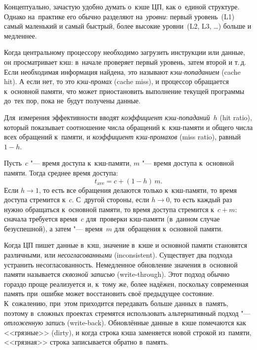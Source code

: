 Концептуально, зачастую удобно думать о~кэше ЦП, как о~единой структуре. Однако на~практике его обычно разделяют на~\emph{уровни}: первый уровень~(L1) самый маленький и самый быстрый, более высокие уровни~(L2, L3, \ldots) больше и медленнее.

Когда центральному процессору необходимо загрузить инструкции или данные, он просматривает кэш: в~начале проверяет первый уровень, затем второй и т.\,д. Если необходимая информация найдена, это называют \textit{кэш-попаданием} (\textenglish{cache hit}). А если нет, то это \textit{кэш-промах} (\textenglish{cache miss}), и процессор обращается к~основной памяти, что может приостановить выполнение текущей программы до~тех пор, пока не~будут получены данные.

Для~измерения эффективности вводят \emph{коэффициент кэш-попаданий}~\(h\) (\textenglish{hit ratio}), который показывает соотношение числа обращений к~кэш-памяти и общего числа всех обращений к~памяти, и \emph{коэффициент кэш-промахов} (\textenglish{miss ratio}), равный \(1 - h\).

Пусть~\(c\) "--- время доступа к~кэш-памяти, \(m\) "--- время доступа к~основной памяти. Тогда среднее время доступа:
\[
  t_\text{ave} = c + (1 - h)\,m.
\]
Если \(h \rightarrow 1\), то есть все обращения делаются только к~кэш-памяти, то время доступа стремится к~\(c\). С~другой стороны, если \(h \rightarrow 0\), то есть каждый раз нужно обращаться к~основной памяти, то время доступа стремится к~\(c + m\): сначала требуется время~\(c\) для~проверки кэш-памяти (в~данном случае безуспешной), а затем "--- время~\(m\) для~обращения к~основной памяти.

Когда ЦП пишет данные в~кэш, значение в~кэше и основной памяти становятся различными, или \textit{несогласованными} (\textenglish{inconsistent}). Существует два подхода устранить несогласованность. Немедленное обновление значения в~основной памяти называется \textit{сквозной записью} (\textenglish{write-through}). Этот подход обычно гораздо проще реализуется и, к~тому же, более надёжен, поскольку современная память при~ошибке может восстановить своё предыдущее состояние. К~сожалению, при~этом приходится передавать больше данных в~память, поэтому в~сложных проектах стремятся использовать альтернативный подход "--- \textit{отложенную запись} (\textenglish{write-back}). Обновлённые данные в~кэше помечаются как <<грязные>> (\textenglish{dirty}), и когда строка кэша заменяется новой строкой из~памяти, <<грязная>> строка записывается обратно в~память.



